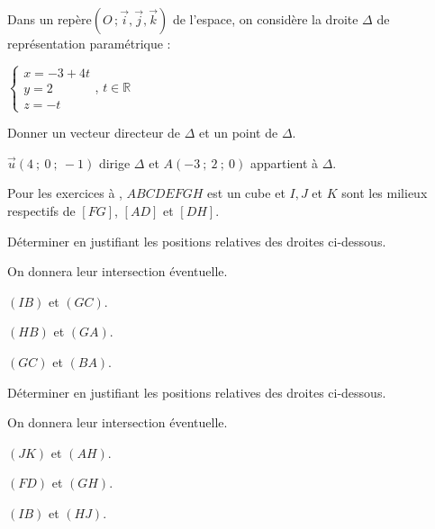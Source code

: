 \documentclass{cornouaille}
\begin{document}
\begin{colonne*exercice}
\pagebreak

\begin{exercice*}
  Dans un repère$(O\,;\vec{i},\vec{j},\vec{k})$ de l'espace, on considère
  la droite $\Delta$ de représentation paramétrique :

\begin{center}
  $\begin{cases}x=-3+4t \\y=2 \\z=-t \end{cases}$, $t\in\mathbb{R}$
\end{center}
Donner un vecteur directeur de $\Delta$ et un point de $\Delta$.
\end{exercice*}
\begin{corrige}
  $\overrightarrow{u}(4\ ;\ 0\ ;\ -1)$ dirige $\Delta$ et
  $A(-3\ ;\ 2\ ;\ 0)$ appartient à $\Delta$.
 \end{corrige}


Pour les exercices  à ,
$ABCDEFGH$ est un cube et $I, J$ et $K$ sont les milieux respectifs de
$[FG]$, $[AD]$ et $[DH]$.

\begin{center}
  
\end{center}

\begin{exercice}\label{G2Exo12}
  Déterminer en justifiant les positions relatives des droites
  ci-dessous. 

  On donnera leur intersection éventuelle.
  \begin{colenumerate}{2}
  \item $(IB)$ et $(GC)$.
  \item $(HB)$ et $(GA)$.
  \item $(GC)$ et $(BA)$.
  \end{colenumerate}
\end{exercice}

\begin{exercice}
  Déterminer en justifiant les positions relatives des droites
  ci-dessous. 

  On donnera leur intersection éventuelle.
  \begin{colenumerate}{2}
  \item $(JK)$ et $(AH)$.
  \item $(FD)$ et $(GH)$.
  \item $(IB)$ et $(HJ)$.
  \end{colenumerate}
\end{exercice}


\end{colonne*exercice}
\end{document}
